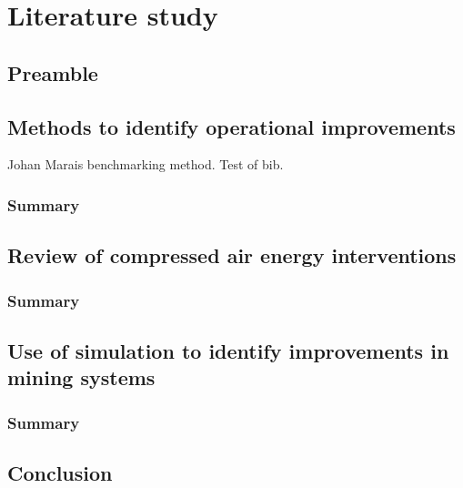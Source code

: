 \chapter{Literature study}
\section{Preamble}
\section{Methods to identify operational improvements}
Johan Marais benchmarking method. Test of bib. \nocite{*}

	\subsection{Summary}
\section{Review of compressed air energy interventions}
	\subsection{Summary}
\section{Use of simulation to identify improvements in mining systems}

	\subsection{Summary}
\section{Conclusion}